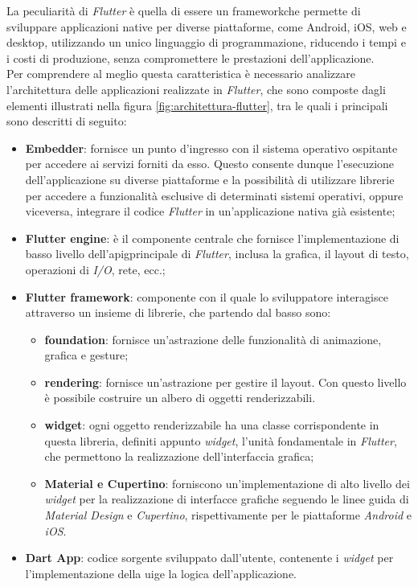 La peculiarità di \emph{Flutter}\cite{site:flutter} è quella di essere un \gls{framework}\glsoccur che permette di sviluppare applicazioni native per diverse piattaforme, come Android, iOS, web e desktop, utilizzando un unico linguaggio di programmazione, riducendo i tempi e i costi di produzione, senza compromettere le prestazioni dell'applicazione.\\
Per comprendere al meglio questa caratteristica è necessario analizzare l'architettura\cite{site:flutter-architecture} delle applicazioni realizzate in \emph{Flutter}\cite{site:flutter}, che sono composte dagli elementi illustrati nella figura \ref{fig:architettura-flutter}, tra le quali i principali sono descritti di seguito:
\begin{itemize}
    \item \textbf{Embedder}: fornisce un punto d'ingresso con il sistema operativo ospitante per accedere ai servizi forniti da esso. Questo consente dunque l'esecuzione dell'applicazione su diverse piattaforme e la possibilità di utilizzare librerie per accedere a funzionalità esclusive di determinati sistemi operativi, oppure viceversa, integrare il codice \emph{Flutter}\cite{site:flutter} in un'applicazione nativa già esistente;
    \item \textbf{Flutter engine}: è il componente centrale che fornisce l'implementazione di basso livello dell'\gls{apig}\glsoccur principale di \emph{Flutter}\cite{site:flutter}, inclusa la grafica, il layout di testo, operazioni di \emph{I/O}, rete, ecc.;
    \item \textbf{Flutter framework}: componente con il quale lo sviluppatore interagisce attraverso un insieme di librerie, che partendo dal basso sono:
    \begin{itemize}
        \item \textbf{foundation}: fornisce un'astrazione delle funzionalità di animazione, grafica e \gls{gesture}\glsoccur;
        \item \textbf{rendering}: fornisce un'astrazione per gestire il layout. Con questo livello è possibile costruire un albero di oggetti renderizzabili.
        \item \textbf{widget}: ogni oggetto renderizzabile ha una classe corrispondente in questa libreria, definiti appunto \emph{widget}, l'unità fondamentale in \emph{Flutter}\cite{site:flutter}, che permettono la realizzazione dell'interfaccia grafica;
        \item \textbf{Material e Cupertino}: forniscono un'implementazione di alto livello dei \emph{widget} per la realizzazione di interfacce grafiche seguendo le linee guida di \emph{Material Design} e \emph{Cupertino}, rispettivamente per le piattaforme \emph{Android} e \emph{iOS}.
    \end{itemize}
    \item \textbf{Dart App}: codice sorgente sviluppato dall'utente, contenente i \emph{widget} per l'implementazione della \gls{uig}\glsoccur e la logica dell'applicazione.
\end{itemize}

